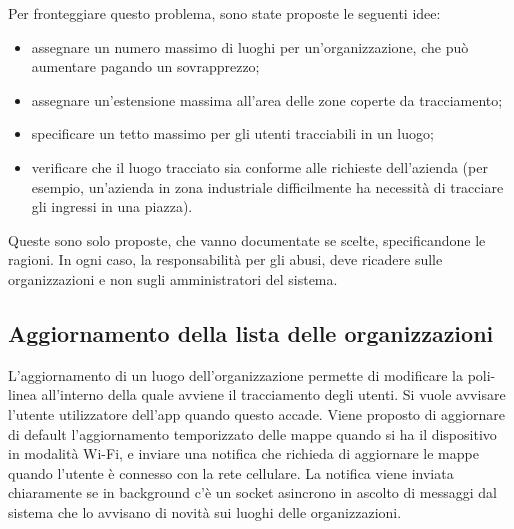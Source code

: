 Per fronteggiare questo problema, sono state proposte le seguenti idee:
\begin{itemize}
	\item assegnare un numero massimo di luoghi per un'organizzazione, che può aumentare pagando un sovrapprezzo;
	\item assegnare un'estensione massima all'area delle zone coperte da tracciamento;
	\item specificare un tetto massimo per gli utenti tracciabili in un luogo;
	\item verificare che il luogo tracciato sia conforme alle richieste dell'azienda (per esempio, un'azienda in zona industriale difficilmente ha necessità di tracciare gli ingressi in una piazza).
\end{itemize}
Queste sono solo proposte, che vanno documentate se scelte, specificandone le ragioni. In ogni caso, la responsabilità per gli abusi, deve ricadere sulle organizzazioni e non sugli amministratori del sistema.

\subsection*{Aggiornamento della lista delle organizzazioni}
L'aggiornamento di un luogo dell'organizzazione permette di modificare la poli-linea all'interno della quale avviene il tracciamento degli utenti. Si vuole avvisare l'utente utilizzatore dell'app quando questo accade.
Viene proposto di aggiornare di default l'aggiornamento temporizzato delle mappe quando si ha il dispositivo in modalità Wi-Fi, e inviare una notifica che richieda di aggiornare le mappe quando l'utente è connesso con la rete cellulare.
La notifica viene inviata chiaramente se in background c'è un socket asincrono in ascolto di messaggi dal sistema che lo avvisano di novità sui luoghi delle organizzazioni.

\clearpage